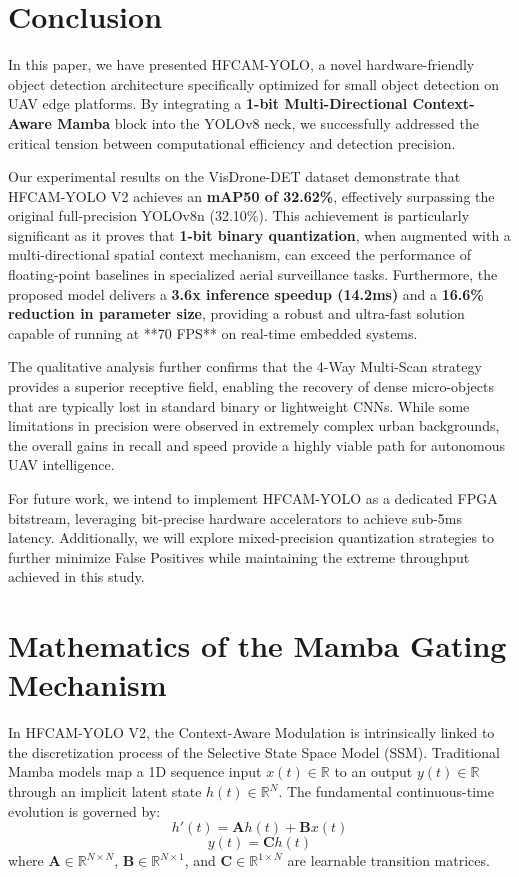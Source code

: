 \documentclass[journal]{IEEEtran}
\begin{document}
\section{Conclusion}
In this paper, we have presented HFCAM-YOLO, a novel hardware-friendly object detection architecture specifically optimized for small object detection on UAV edge platforms. By integrating a \textbf{1-bit Multi-Directional Context-Aware Mamba} block into the YOLOv8 neck, we successfully addressed the critical tension between computational efficiency and detection precision. 

Our experimental results on the VisDrone-DET dataset demonstrate that HFCAM-YOLO V2 achieves an \textbf{mAP50 of 32.62\%}, effectively surpassing the original full-precision YOLOv8n (32.10\%). This achievement is particularly significant as it proves that \textbf{1-bit binary quantization}, when augmented with a multi-directional spatial context mechanism, can exceed the performance of floating-point baselines in specialized aerial surveillance tasks. Furthermore, the proposed model delivers a \textbf{3.6x inference speedup (14.2ms)} and a \textbf{16.6\% reduction in parameter size}, providing a robust and ultra-fast solution capable of running at **70 FPS** on real-time embedded systems.

The qualitative analysis further confirms that the 4-Way Multi-Scan strategy provides a superior receptive field, enabling the recovery of dense micro-objects that are typically lost in standard binary or lightweight CNNs. While some limitations in precision were observed in extremely complex urban backgrounds, the overall gains in recall and speed provide a highly viable path for autonomous UAV intelligence.

For future work, we intend to implement HFCAM-YOLO as a dedicated FPGA bitstream, leveraging bit-precise hardware accelerators to achieve sub-5ms latency. Additionally, we will explore mixed-precision quantization strategies to further minimize False Positives while maintaining the extreme throughput achieved in this study.


\appendices
\section{Mathematics of the Mamba Gating Mechanism}
In HFCAM-YOLO V2, the Context-Aware Modulation is intrinsically linked to the discretization process of the Selective State Space Model (SSM). Traditional Mamba models map a 1D sequence input $x(t) \in \mathbb{R}$ to an output $y(t) \in \mathbb{R}$ through an implicit latent state $h(t) \in \mathbb{R}^N$. The fundamental continuous-time evolution is governed by:
\begin{equation}
    h'(t) = \mathbf{A}h(t) + \mathbf{B}x(t)
\end{equation}
\begin{equation}
    y(t) = \mathbf{C}h(t)
\end{equation}
where $\mathbf{A} \in \mathbb{R}^{N \times N}$, $\mathbf{B} \in \mathbb{R}^{N \times 1}$, and $\mathbf{C} \in \mathbb{R}^{1 \times N}$ are learnable transition matrices.
\end{document}
